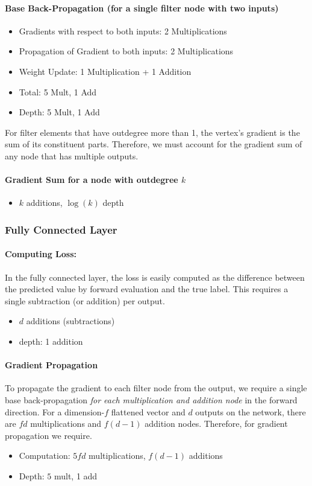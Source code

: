 \paragraph{Base Back-Propagation (for a single filter node with two inputs)}
\begin{itemize}
	\item Gradients with respect to both inputs: 2 Multiplications
	\item Propagation of Gradient to both inputs: 2 Multiplications
	\item Weight Update: 1 Multiplication + 1 Addition
	\item Total: 5 Mult, 1 Add
	\item Depth: 5 Mult, 1 Add
\end{itemize}

For filter elements that have outdegree more than 1, the vertex's gradient is the sum of its constituent parts. Therefore, we must account for the gradient sum of any node that has multiple outputs.

\paragraph{Gradient Sum for a node with outdegree $k$}
\begin{itemize}
	\item $k$ additions, $\log(k)$ depth 
\end{itemize}

\subsubsection{Fully Connected Layer}

\paragraph{Computing Loss:}
In the fully connected layer, the loss is easily computed as the difference between the predicted value by forward evaluation and the true label. This requires a single subtraction (or addition) per output.
\begin{itemize}
	\item $d$ additions (subtractions)
	\item depth: 1 addition
\end{itemize}

\paragraph{Gradient Propagation}
To propagate the gradient to each filter node from the output, we require a single base back-propagation \emph{for each multiplication and addition node} in the forward direction. For a dimension-$f$ flattened vector and $d$ outputs on the network, there are $fd$ multiplications and $f(d-1)$ addition nodes. Therefore, for gradient propagation we require.
\begin{itemize}
	\item Computation: $5fd$ multiplications, $f(d-1)$ additions
	\item Depth: $5$ mult, 1 add
\end{itemize}

